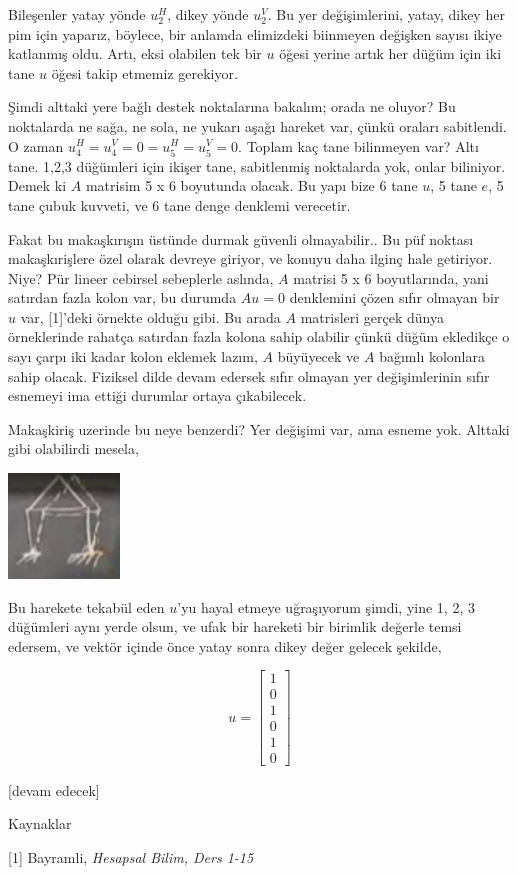 \documentclass[12pt,fleqn]{article}\usepackage{../../common}
\begin{document}
Bileşenler yatay yönde $u_2^H$, dikey yönde $u_2^V$. Bu yer değişimlerini,
yatay, dikey her pim için yaparız, böylece, bir anlamda elimizdeki biinmeyen
değişken sayısı ikiye katlanmış oldu. Artı, eksi olabilen tek bir $u$ öğesi
yerine artık her düğüm için iki tane $u$ öğesi takip etmemiz gerekiyor.

Şimdi alttaki yere bağlı destek noktalarına bakalım; orada ne oluyor?  Bu
noktalarda ne sağa, ne sola, ne yukarı aşağı hareket var, çünkü oraları
sabitlendi. O zaman $u_4^H = u_4^V = 0 = u_5^H = u_5^V = 0$.  Toplam kaç tane
bilinmeyen var? Altı tane. 1,2,3 düğümleri için ikişer tane, sabitlenmiş
noktalarda yok, onlar biliniyor. Demek ki $A$ matrisim 5 x 6 boyutunda olacak.
Bu yapı bize 6 tane $u$, 5 tane $e$, 5 tane çubuk kuvveti, ve 6 tane denge
denklemi verecetir.

Fakat bu makaşkırışın üstünde durmak güvenli olmayabilir.. Bu püf noktası
makaşkırişlere özel olarak devreye giriyor, ve konuyu daha ilginç hale
getiriyor. Niye? Pür lineer cebirsel sebeplerle aslında, $A$ matrisi 5 x 6
boyutlarında, yani satırdan fazla kolon var, bu durumda $A u = 0$ denklemini
çözen sıfır olmayan bir $u$ var, [1]'deki örnekte olduğu gibi. Bu arada $A$
matrisleri gerçek dünya örneklerinde rahatça satırdan fazla kolona sahip
olabilir çünkü düğüm ekledikçe o sayı çarpı iki kadar kolon eklemek lazım, $A$
büyüyecek ve $A$ bağımlı kolonlara sahip olacak. Fiziksel dilde devam edersek
sıfır olmayan yer değişimlerinin sıfır esnemeyi ima ettiği durumlar ortaya
çıkabilecek.

Makaşkiriş uzerinde bu neye benzerdi? Yer değişimi var, ama esneme yok.  Alttaki
gibi olabilirdi mesela,

\includegraphics[width=8em]{compscieng_1_15_03.png}

Bu harekete tekabül eden $u$'yu hayal etmeye uğraşıyorum şimdi, yine 1, 2, 3
düğümleri aynı yerde olsun, ve ufak bir hareketi bir birimlik değerle temsi
edersem, ve vektör içinde önce yatay sonra dikey değer gelecek şekilde,

$$
u = \left[\begin{array}{r}
1 \\ 0 \\ 1 \\ 0 \\ 1 \\ 0
\end{array}\right]
$$











[devam edecek]

Kaynaklar

[1] Bayramli, {\em Hesapsal Bilim, Ders 1-15}
\end{document}

